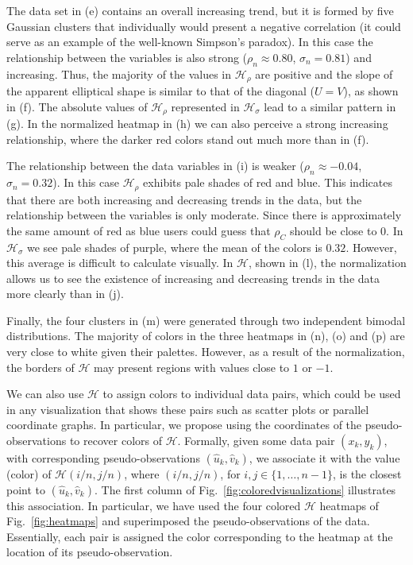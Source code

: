 \documentclass[journal]{vgtc}                %
\begin{document}
The data set in (e) contains an overall increasing trend, but it is formed by five Gaussian clusters that individually would present a negative correlation (it could serve as an example of the well-known Simpson's paradox). In this case the relationship between the variables is also strong ($\rho_{n}\approx 0.80$, $\sigma_{n} = 0.81$) and increasing. Thus, the majority of the values in $\mathcal{H}_{\rho}$ are positive and the slope of the apparent elliptical shape is similar to that of the diagonal ($U = V$), as shown in (f). The absolute values of $\mathcal{H}_{\rho}$ represented in $\mathcal{H}_{\sigma}$ lead to a similar pattern in (g). In the normalized heatmap in (h) we can also perceive a strong increasing relationship, where the darker red colors stand out much more than in (f).

The relationship between the data variables in (i) is weaker ($\rho_{n}\approx -0.04$, $\sigma_{n} = 0.32$). In this case $\mathcal{H}_{\rho}$ exhibits pale shades of red and blue. This indicates that there are both increasing and decreasing trends in the data, but the relationship between the variables is only moderate. Since there is approximately the same amount of red as blue users could guess that $\rho_{C}$ should be close to $0$. In $\mathcal{H}_{\sigma}$ we see pale shades of purple, where the mean of the colors is $0.32$. However, this average is difficult to calculate visually. In $\mathcal{H}$, shown in (l), the normalization allows us to see the existence of increasing and decreasing trends in the data more clearly than in (j).

Finally, the four clusters in (m) were generated through two independent bimodal distributions. The majority of colors in the three heatmaps in (n), (o) and (p) are very close to white given their palettes. However, as a result of the normalization, the borders of $\mathcal{H}$ may present regions with values close to $1$ or $-1$.









We can also use $\mathcal{H}$ to assign colors to individual data pairs, which could be used in any visualization that shows these pairs such as scatter plots or parallel coordinate graphs. In particular, we propose using the coordinates of the pseudo-observations to recover colors of $\mathcal{H}$. Formally, given some data pair $(x_{k},y_{k})$, with corresponding pseudo-observations $(\hat{u}_{k},\hat{v}_{k})$, we associate it with the value (color) of $\mathcal{H}(i/n,j/n)$, where $(i/n,j/n)$, for $i,j\in\{1,\ldots,n-1\}$, is the closest point to $(\hat{u}_{k},\hat{v}_{k})$. The first column of Fig.~\ref{fig:coloredvisualizations} illustrates this association. In particular, we have used the four colored $\mathcal{H}$ heatmaps of Fig.~\ref{fig:heatmaps} and superimposed the pseudo-observations of the data. Essentially, each pair is assigned the color corresponding to the heatmap at the location of its pseudo-observation. 
\end{document}
